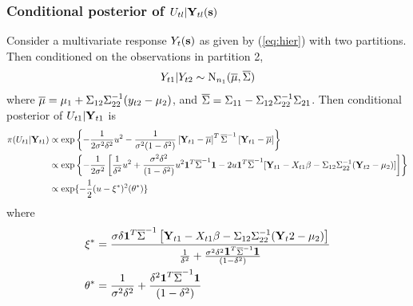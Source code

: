 \subsubsection*{Conditional posterior of $U_{tl} | \mbox{\bf Y}_{tl}(\mbox{\bf s})$}\label{s:mvcondu}
Consider a multivariate response $Y_t(\mbox{\bf s})$ as given by (\ref{eq:hier}) with two partitions. 
Then conditioned on the observations in partition 2,  
\begin{align}
  Y_{t1} | Y_{t2} \sim \mbox{N}_{n_1} (\overline{\mu}, \overline{\Sigma})
\end{align}
where $\overline{\mu} = \mu_1 + \Sigma_{12} \Sigma_{22}^{-1}(y_{t2} - \mu_{2})$, and $\overline{\Sigma} = \Sigma_{11} - \Sigma_{12} \Sigma_{22}^{-1}\Sigma_{21}$. 
Then conditional posterior of $U_{t1} | \mbox{\bf Y}_{t1}$ is
\begin{align}
  \pi(U_{t1} | \mbox{\bf Y}_{t1}) & \propto \exp \left\{ -\frac{ 1 }{ 2 \sigma^2 \delta^2 } u^2 - \frac{ 1 }{ \sigma^2 (1 - \delta^2 ) } \left[ \mbox{\bf Y}_{t1} - \overline{\mu} \right]^T \overline{\Sigma}^{-1} \left[ \mbox{\bf Y}_{t1} - \overline{\mu} \right] \right\}\\
  & \propto \exp \left\{ - \frac{1}{2 \sigma^2} \left[ \frac{ 1 }{ \delta^2 } u^2 + \frac{ \sigma^2 \delta^2 }{ (1 - \delta^2) } u^2 \mbox{\boldmath $1$}^T \overline{\Sigma}^{-1} \mbox{\boldmath $1$} - 2u\mbox{\boldmath $1$}^T \overline{\Sigma}^{-1} [\mbox{\bf Y}_{t1} - X_{t1}\beta - \Sigma_{12} \Sigma_{22}^{-1} (\mbox{\bf Y}_{t2} - \mu_2)] \right]\right\}\\
  & \propto \exp \{ -\frac{ 1 }{ 2 } (u - \xi^*)^2 (\theta^*) \}
\end{align}
where
\begin{align}
  \xi^* &= \frac{ \sigma \delta \mbox{\boldmath $1$}^T \overline{\Sigma}^{-1}\left[ \mbox{\bf Y}_{t1} - X_{t1}\beta - \Sigma_{12} \Sigma_{22}^{-1} (\mbox{\bf Y}_t2 - \mu_2)\right]}{\frac{ 1 }{ \delta^2 } + \frac{ \sigma^2 \delta^2 \mbox{\boldmath $1$}^T \overline{\Sigma}^{-1} \mbox{\boldmath $1$}}{(1 - \delta^2)}}\\
  \theta^* &= \frac{ 1 }{ \sigma^2 \delta^2 } + \frac{ \delta^2 \mbox{\boldmath $1$}^T \overline{\Sigma}^{-1} \mbox{\boldmath $1$} }{ (1 - \delta^2 )}
\end{align}


